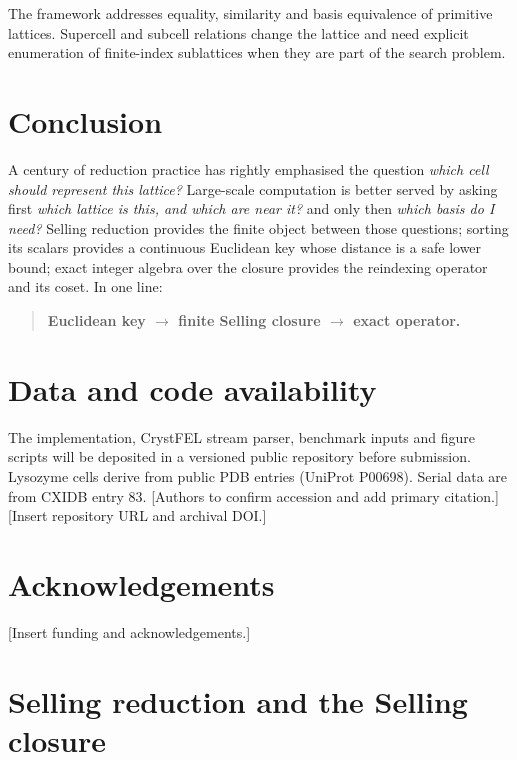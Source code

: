 \documentclass[11pt]{article}
\begin{document}
The framework addresses equality, similarity and basis equivalence of primitive lattices. Supercell and subcell relations change the lattice and need explicit enumeration of finite-index sublattices when they are part of the search problem.

\section{Conclusion}

A century of reduction practice has rightly emphasised the question \emph{which cell should represent this lattice?} Large-scale computation is better served by asking first \emph{which lattice is this, and which are near it?} and only then \emph{which basis do I need?} Selling reduction provides the finite object between those questions; sorting its scalars provides a continuous Euclidean key whose distance is a safe lower bound; exact integer algebra over the closure provides the reindexing operator and its coset. In one line:
\begin{quote}
\textbf{Euclidean key $\rightarrow$ finite Selling closure $\rightarrow$ exact operator.}
\end{quote}

\section*{Data and code availability}
The implementation, CrystFEL stream parser, benchmark inputs and figure scripts will be deposited in a versioned public repository before submission. Lysozyme cells derive from public PDB entries (UniProt P00698). Serial data are from CXIDB entry 83. [Authors to confirm accession and add primary citation.] [Insert repository URL and archival DOI.]

\section*{Acknowledgements}
[Insert funding and acknowledgements.]

\appendix

\section{Selling reduction and the Selling closure}
\label{app:closure}
\end{document}
